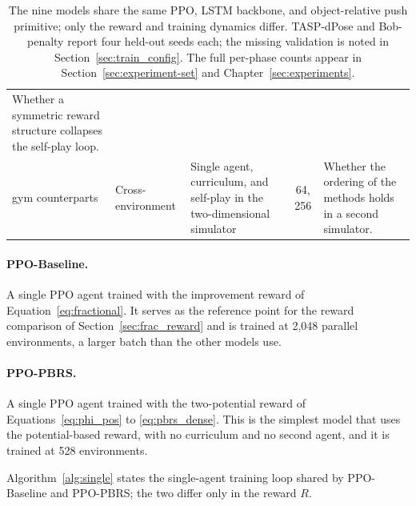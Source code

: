 \begin{landscape}
\begin{table}[p]
\begin{tabularx}{\linewidth}{@{}l p{2.4cm} >{\hsize=0.85\hsize\arraybackslash}X c >{\hsize=1.15\hsize\arraybackslash}X@{}}
        Whether a symmetric reward structure collapses the self-play loop. \\[2pt]
        gym counterparts & Cross-environment & Single agent, curriculum, and
        self-play in the two-dimensional simulator & 64, 256 &
        Whether the ordering of the methods holds in a second simulator. \\
        \hline
    \end{tabularx}
    \caption{The nine models share the same PPO, LSTM backbone, and
    object-relative push primitive; only the reward and training dynamics
    differ. TASP-dPose and Bob-penalty report four held-out seeds each; the
    missing validation is noted in Section~\ref{sec:train_config}. The full
    per-phase counts appear in Section~\ref{sec:experiment-set} and
    Chapter~\ref{sec:experiments}.}
    \label{tab:models}
\end{table}
\end{landscape}

\FloatBarrier

\paragraph{PPO-Baseline.}
A single PPO agent trained with the improvement reward of
Equation~\ref{eq:fractional}. It serves as the reference point for the reward
comparison of Section~\ref{sec:frac_reward} and is trained at 2{,}048 parallel
environments, a larger batch than the other models use.

\paragraph{PPO-PBRS.}
A single PPO agent trained with the two-potential reward of
Equations~\ref{eq:phi_pos} to \ref{eq:pbrs_dense}. This is the simplest model that
uses the potential-based reward, with no curriculum and no second agent, and it
is trained at 528 environments.

Algorithm~\ref{alg:single} states the single-agent training loop shared by
PPO-Baseline and PPO-PBRS; the two differ only in the reward $R$.

